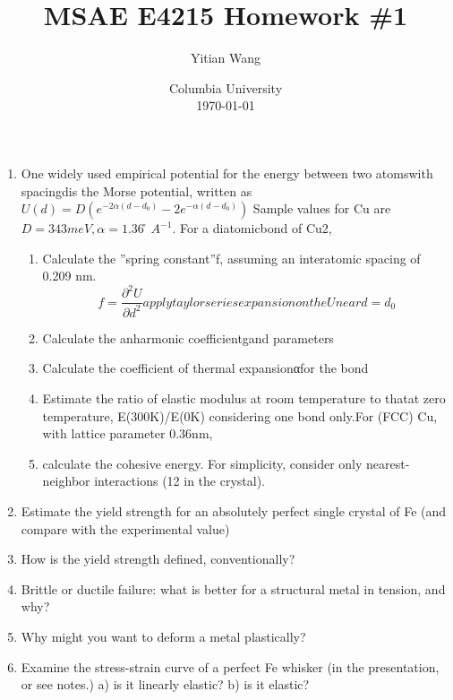 \documentclass{article}
\title{MSAE E4215 Homework \#1}
\author{Yitian Wang}
\date{Columbia University \\ \today}
\begin{document}
\maketitle
\begin{enumerate}
\item One widely used empirical potential for the energy between two atomswith spacingdis the Morse potential, 
written as
$U(d) =D(e^{-2α(d - d_0)} - 2e^{ - α(d - d_0)})$
Sample values for Cu are$D= 343 meV,α= 1.36 ̊A^{−1}$.  
For a diatomicbond of Cu2,

\begin{enumerate}[label=(\alph*)]
\item Calculate the ”spring constant”f, assuming an interatomic spacing of 0.209 nm.
\begin{equation}
f=\frac{\partial^2 U}{\partial d^2}
apply taylor series expansion on the U near d=d_0

\end{equation}
\item Calculate the anharmonic coefficientgand parameters
\item Calculate the coefficient of thermal expansionαfor the bond
\item Estimate the ratio of elastic modulus at room temperature to thatat zero temperature,
E(300K)/E(0K) considering one bond only.For (FCC) Cu, 
with lattice parameter 0.36nm,
\item calculate the cohesive energy. For simplicity, consider only nearest-neighbor interactions (12 in the crystal).

\end{enumerate}


\item Estimate the yield strength for an absolutely perfect single crystal of Fe 
(and compare with the experimental value)

\item How is the yield strength defined, conventionally? 

\item Brittle or ductile failure: what is better for a structural metal in tension, 
and why?

\item Why might you want to deform a metal plastically? 

\item Examine the stress-strain curve of a perfect Fe whisker (in the presentation, or see notes.)  
a) is it linearly elastic?  b) is it elastic? 


\end{enumerate}
\end{document}
